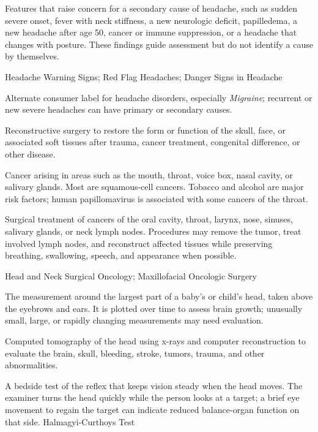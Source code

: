  Features that raise concern for a secondary cause of headache, such as sudden severe onset, fever with neck stiffness, a new neurologic deficit, papilledema, a new headache after age 50, cancer or immune suppression, or a headache that changes with posture. These findings guide assessment but do not identify a cause by themselves.

\synonyms
Headache Warning Signs; Red Flag Headaches; Danger Signs in Headache

 Alternate consumer label for headache disorders, especially \textit{Migraine}; recurrent or new severe headaches can have primary or secondary causes.

 Reconstructive surgery to restore the form or function of the skull, face, or associated soft tissues after trauma, cancer treatment, congenital difference, or other disease.

 Cancer arising in areas such as the mouth, throat, voice box, nasal cavity, or salivary glands. Most are squamous-cell cancers. Tobacco and alcohol are major risk factors; human papillomavirus is associated with some cancers of the throat.

 Surgical treatment of cancers of the oral cavity, throat, larynx, nose, sinuses, salivary glands, or neck lymph nodes. Procedures may remove the tumor, treat involved lymph nodes, and reconstruct affected tissues while preserving breathing, swallowing, speech, and appearance when possible.

\synonyms
Head and Neck Surgical Oncology; Maxillofacial Oncologic Surgery

 The measurement around the largest part of a baby’s or child’s head, taken above the eyebrows and ears. It is plotted over time to assess brain growth; unusually small, large, or rapidly changing measurements may need evaluation.

 Computed tomography of the head using x-rays and computer reconstruction to evaluate the brain, skull, bleeding, stroke, tumors, trauma, and other abnormalities.

 A bedside test of the reflex that keeps vision steady when the head moves. The examiner turns the head quickly while the person looks at a target; a brief eye movement to regain the target can indicate reduced balance-organ function on that side.
\synonyms
Halmagyi-Curthoys Test

